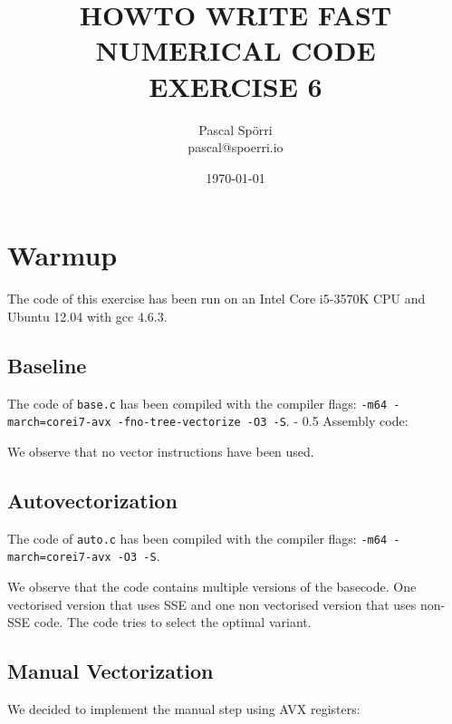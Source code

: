 \documentclass[portrait,a4paper]{article}
\makeatletter
\renewcommand\paragraph{\@startsection{paragraph}{4}{0mm}%
    {-\baselineskip}%
    {0.5\baselineskip}%
    {\normalfont\bfseries}%
}%
\makeatother
\begin{document}
 \author{Pascal Spörri\\pascal@spoerri.io}
 \title{HOWTO WRITE FAST NUMERICAL CODE\\ EXERCISE 6}
 \date{\today}
\maketitle

\section{Warmup}
The code of this exercise has been run on an Intel Core i5-3570K CPU and Ubuntu 12.04 with gcc 4.6.3.


\subsection{Baseline}
The code of \lstinline{base.c} has been compiled with the compiler flags: \lstinline{-m64 -march=corei7-avx -fno-tree-vectorize -O3 -S}.
\paragraph{Assembly code:} 



We observe that no vector instructions have been used.

\subsection{Autovectorization}
The code of \lstinline{auto.c} has been compiled with the compiler flags: \lstinline{-m64 -march=corei7-avx -O3 -S}.


We observe that the code contains multiple versions of the basecode. One vectorised version that uses SSE and one non vectorised version that uses non-SSE code. The code tries to select the optimal variant.

\subsection{Manual Vectorization}
We decided to implement the manual step using AVX registers:

\end{document}
